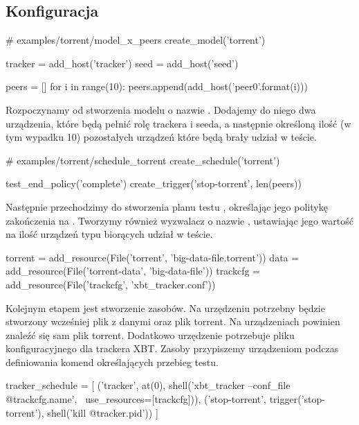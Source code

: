 \documentclass[00-praca-magisterska.tex]{subfiles}
\begin{document}
\subsection{Konfiguracja}

\begin{pythoncode}
  # examples/torrent/model_x_peers
  create_model('torrent')

  tracker = add_host('tracker')
  seed = add_host('seed')

  peers = []
  for i in range(10):
      peers.append(add_host('peer{0}'.format(i)))
\end{pythoncode}

Rozpoczynamy od stworzenia modelu o nazwie . Dodajemy do niego dwa
urządzenia, które będą pełnić rolę trackera i seeda, a następnie określoną ilość
(w tym wypadku 10) pozostałych urządzeń które będą brały udział w teście.

\begin{pythoncode}
  # examples/torrent/schedule_torrent
  create_schedule('torrent')
    
  test_end_policy('complete')
  create_trigger('stop-torrent', len(peers))
\end{pythoncode}

Następnie przechodzimy do stworzenia planu testu , określając jego
politykę zakończenia na . Tworzymy również wyzwalacz o nazwie
, ustawiając jego wartość na ilość urządzeń typu 
biorących udział w teście.

\begin{pythoncode}
  torrent = add_resource(File('torrent', 'big-data-file.torrent'))
  data = add_resource(File('torrent-data', 'big-data-file'))
  trackcfg = add_resource(File('trackcfg', 'xbt_tracker.conf'))
\end{pythoncode}

Kolejnym etapem jest stworzenie zasobów. Na urzędzeniu  potrzebny
będzie stworzony wcześniej plik z danymi oraz plik torrent. Na urządzeniach
 powinien znaleźć się sam plik torrent. Dodatkowo urzędzenie
 potrzebuje pliku konfiguracyjnego dla trackera XBT. Zasoby
przypiszemy urządzeniom podczas definiowania komend określających przebieg testu.

\begin{pythoncode}
  tracker_schedule = [
      ('tracker', at(0), shell('xbt_tracker --conf_file @{trackcfg.name}', \
          use_resources=[trackcfg])),
      ('stop-torrent', trigger('stop-torrent'), shell('kill @{tracker.pid}'))
  ]
\end{pythoncode}
\end{document}
